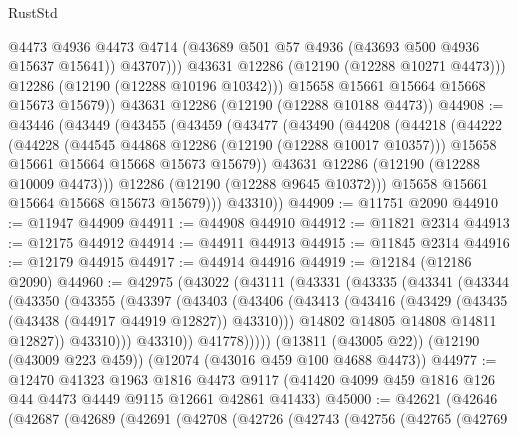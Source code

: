 \begin{lexlean}{RustStd}
\begin{coremodule}
                  @4473
                  @4936
                  @4473
                  @4714
                  (@43689 @501 @57 @4936 (@43693 @500 @4936 @15637 @15641))
                  @43707)))
            @43631
            @12286
            (@12190 (@12288 @10271 @4473)))
          @12286
          (@12190 (@12288 @10196 @10342)))
        @15658
        @15661
        @15664
        @15668
        @15673
        @15679))
    @43631
    @12286
    (@12190 (@12288 @10188 @4473))
@44908 := @43446
    (@43449
      (@43455
        (@43459
          (@43477
            (@43490
              (@44208
                (@44218
                  (@44222
                    (@44228
                      (@44545 @44868 @12286 (@12190 (@12288 @10017 @10357)))
                      @15658
                      @15661
                      @15664
                      @15668
                      @15673
                      @15679))
                  @43631
                  @12286
                  (@12190 (@12288 @10009 @4473)))
                @12286
                (@12190 (@12288 @9645 @10372)))
              @15658
              @15661
              @15664
              @15668
              @15673
              @15679)))
        @43310))
@44909 := @11751 @2090
@44910 := @11947 @44909
@44911 := @44908 @44910
@44912 := @11821 @2314
@44913 := @12175 @44912
@44914 := @44911 @44913
@44915 := @11845 @2314
@44916 := @12179 @44915
@44917 := @44914 @44916
@44919 := @12184 (@12186 @2090)
@44960 := @42975
    (@43022
      (@43111
        (@43331
          (@43335
            (@43341
              (@43344
                (@43350
                  (@43355
                    (@43397
                      (@43403
                        (@43406
                          (@43413
                            (@43416 (@43429 (@43435 (@43438 (@44917 @44919 @12827)) @43310)))
                            @14802
                            @14805
                            @14808
                            @14811
                            @12827))
                        @43310)))
                  @43310))
              @41778)))))
    (@13811 (@43005 @22))
    (@12190 (@43009 @223 @459))
    (@12074 (@43016 @459 @100 @4688 @4473))
@44977 := @12470
    @41323
    @1963
    @1816
    @4473
    @9117
    (@41420 @4099 @459 @1816 @126 @44 @4473 @4449 @9115 @12661 @42861 @41433)
@45000 := @42621
    (@42646
      (@42687
        (@42689
          (@42691
            (@42708
              (@42726
                (@42743
                  (@42756
                    (@42765
                      (@42769

\end{coremodule}
\end{lexlean}

